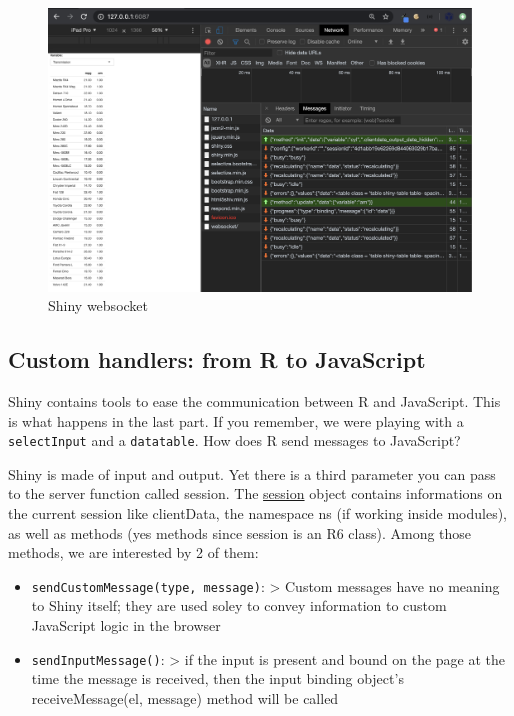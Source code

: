 \documentclass[]{book}
\providecommand{\tightlist}{%
  \setlength{\itemsep}{0pt}\setlength{\parskip}{0pt}}
\begin{document}
\begin{figure}
\includegraphics[width=27.69in]{images/survival-kit/shiny-websocket} \caption{Shiny websocket}\label{fig:shiny-websocket}
\end{figure}

\hypertarget{custom-handlers-from-r-to-javascript}{%
\subsection{Custom handlers: from R to JavaScript}\label{custom-handlers-from-r-to-javascript}}

Shiny contains tools to ease the communication between R and JavaScript. This is what happens in the last part. If you remember, we were playing with a \texttt{selectInput} and a \texttt{datatable}. How does R send messages to JavaScript?

Shiny is made of input and output. Yet there is a third parameter you can pass to the server function called session. The \href{https://shiny.rstudio.com/reference/shiny/1.4.0/session.html}{session} object contains informations on the current session like clientData, the namespace ns (if working inside modules), as well as methods (yes methods since session is an R6 class). Among those methods, we are interested by 2 of them:

\begin{itemize}
\tightlist
\item
  \texttt{sendCustomMessage(type,\ message)}: \textgreater{} Custom messages have no meaning to Shiny itself; they are used soley to convey information to custom JavaScript logic in the browser
\item
  \texttt{sendInputMessage()}: \textgreater{} if the input is present and bound on the page at the time the message is received, then the input binding object's receiveMessage(el, message) method will be called
\end{itemize}
\end{document}
